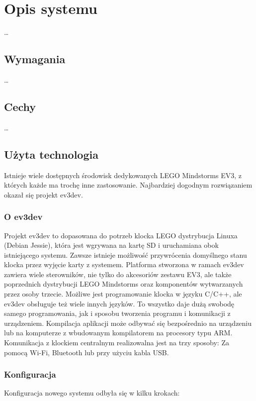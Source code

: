 \chapter{Opis systemu}

\ldots

\section{Wymagania}

\ldots

\section{Cechy}

\ldots

\section{Użyta technologia}

Istnieje wiele dostępnych środowisk dedykowanych LEGO Mindstorms EV3, z których każde ma trochę inne zastosowanie. Najbardziej dogodnym rozwiązaniem okazał się projekt ev3dev.

\subsection{O ev3dev}
Projekt ev3dev to dopasowana do potrzeb klocka LEGO dystrybucja Linuxa (Debian Jessie), która jest wgrywana na kartę SD i uruchamiana obok istniejącego systemu. Zawsze istnieje możliwość przywrócenia domyślnego stanu klocka przez wyjęcie karty z systemem. Platforma stworzona w ramach ev3dev zawiera wiele sterowników, nie tylko do akcesoriów zestawu EV3, ale także poprzednich dystrybucji LEGO Mindstorms oraz komponentów wytwarzanych przez osoby trzecie. Możliwe jest programowanie klocka w języku C/C++, ale ev3dev obsługuje też wiele innych języków. To wszystko daje dużą swobodę samego programowania, jak i sposobu tworzenia programu i komunikacji z urządzeniem. Kompilacja aplikacji może odbywać się bezpośrednio na urządzeniu lub na komputerze z wbudowanym kompilatorem na procesory typu ARM. Komunikacja z klockiem centralnym realizowalna jest na trzy sposoby: Za pomocą Wi-Fi, Bluetooth lub przy użyciu kabla USB.

\subsection{Konfiguracja}
Konfiguracja nowego systemu odbyła się w kilku krokach:

